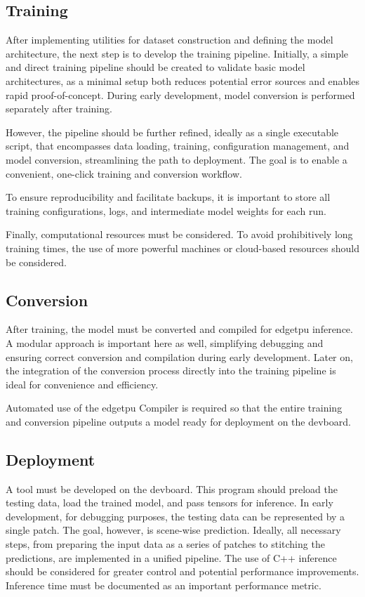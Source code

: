 {\subsection*{Training}

After implementing utilities for dataset construction and defining the model architecture, the next step is to develop the training pipeline.
Initially, a simple and direct training pipeline should be created to validate basic model architectures, as a minimal setup both reduces potential error sources and enables rapid proof-of-concept.
During early development, model conversion is performed separately after training.

However, the pipeline should be further refined, ideally as a single executable script, that encompasses data loading, training, configuration management, and model conversion,
streamlining the path to deployment. The goal is to enable a convenient, one-click training and conversion workflow.

To ensure reproducibility and facilitate backups, it is important to store all training configurations, logs, and intermediate model weights for each run.

Finally, computational resources must be considered. To avoid prohibitively long training times, the use of more powerful machines or cloud-based resources should be considered.

\subsection*{Conversion}

After training, the model must be converted and compiled for \gls{edgetpu} inference.
A modular approach is important here as well, simplifying debugging and ensuring correct conversion and compilation during early development.
Later on, the integration of the conversion process directly into the training pipeline is ideal for convenience and efficiency.

Automated use of the \gls{edgetpu} Compiler is required so that the entire training and conversion pipeline outputs a model ready for deployment on the \gls{devboard}.

\subsection*{Deployment}

A tool must be developed on the \gls{devboard}. This program should preload the testing data, load the trained model, and pass
tensors for inference. In early development, for debugging purposes, the testing data can be represented by a single patch.
The goal, however, is scene-wise prediction. Ideally, all necessary steps, from preparing the input data as a series of patches
to stitching the predictions, are implemented in a unified pipeline. The use of C++ inference should be considered for greater control
and potential performance improvements. Inference time must be documented as an important performance metric.

}
